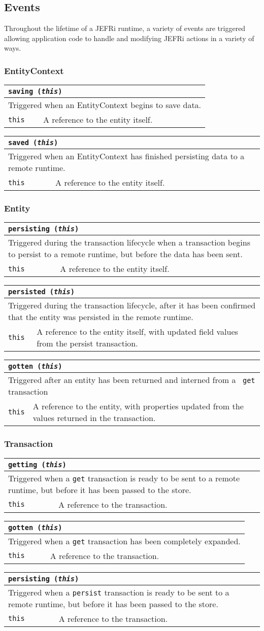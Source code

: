\documentclass{article}
\newcommand{\ilcode}{\tt}
\newcommand{\method}[4]{
	\noindent
	\begin{tabular}{ | l | p{5in} | }
	\hline
	\multicolumn{2}{|l|}{\large \ilcode #1 ({\it #2})} \\
	\hline
	\multicolumn{2}{|p{6in}|}{#3} \\
	\hline
	#4
	\end{tabular}
}
\newcommand{\param}[2]{
	{\ilcode #1} & #2 \\
	\hline
}
\newcommand{\event}[4]{\method{#1}{#2}{#3}{#4}}
\begin{document}
\subsection{Events}
Throughout the lifetime of a JEFRi runtime, a variety of events are triggered
allowing application code to handle and modifying JEFRi actions in a variety of
ways.

\subsubsection{EntityContext}
\event{saving}{this}
	{Triggered when an EntityContext begins to save data.}
	{\param{this}{A reference to the entity itself.}}

\event{saved}{this}
	{Triggered when an EntityContext has finished persisting data to a remote
	runtime.}
	{\param{this}{A reference to the entity itself.}}

\subsubsection{Entity}
\event{persisting}{this}
	{Triggered during the transaction lifecycle when a transaction begins to
	persist to a remote runtime, but before the data has been sent.}
	{\param{this}{A reference to the entity itself.}}

\event{persisted}{this}
	{Triggered during the transaction lifecycle, after it has been confirmed
	that the entity was persisted in the remote runtime.}
	{\param{this}{A reference to the entity itself, with updated field values
	from the persist transaction.}}

\event{gotten}{this}
	{Triggered after an entity has been returned and interned from a {\ilcode
	get} transaction}
	{\param{this}{A reference to the entity, with properties updated from the
	values returned in the transaction.}}

\subsubsection{Transaction}
\event{getting}{this}
	{Triggered when a {\ilcode get} transaction is ready to be sent to a remote
	runtime, but before it has been passed to the store.}
	{\param{this}{A reference to the transaction.}}

\event{gotten}{this}
	{Triggered when a {\ilcode get} transaction has been completely expanded.}
	{\param{this}{A reference to the transaction.}}

\event{persisting}{this}
	{Triggered when a {\ilcode persist} transaction is ready to be sent to a
	remote runtime, but before it has been passed to the store.}
	{\param{this}{A reference to the transaction.}}
\end{document}
